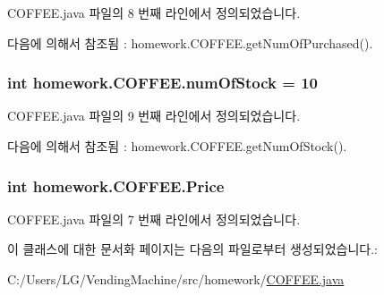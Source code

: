 C\+O\+F\+F\+E\+E.\+java 파일의 8 번째 라인에서 정의되었습니다.



다음에 의해서 참조됨 \+:  homework.\+C\+O\+F\+F\+E\+E.\+get\+Num\+Of\+Purchased().

\subsubsection[{\texorpdfstring{num\+Of\+Stock}{numOfStock}}]{\setlength{\rightskip}{0pt plus 5cm}int homework.\+C\+O\+F\+F\+E\+E.\+num\+Of\+Stock = 10\hspace{0.3cm}{\ttfamily [protected]}}\hypertarget{classhomework_1_1_c_o_f_f_e_e_a67a941996cd461c1e4aefd5aeb110ba9}{}\label{classhomework_1_1_c_o_f_f_e_e_a67a941996cd461c1e4aefd5aeb110ba9}


C\+O\+F\+F\+E\+E.\+java 파일의 9 번째 라인에서 정의되었습니다.



다음에 의해서 참조됨 \+:  homework.\+C\+O\+F\+F\+E\+E.\+get\+Num\+Of\+Stock().

\subsubsection[{\texorpdfstring{Price}{Price}}]{\setlength{\rightskip}{0pt plus 5cm}int homework.\+C\+O\+F\+F\+E\+E.\+Price\hspace{0.3cm}{\ttfamily [protected]}}\hypertarget{classhomework_1_1_c_o_f_f_e_e_a8b1ac1950929ce32fcd8bcc601560546}{}\label{classhomework_1_1_c_o_f_f_e_e_a8b1ac1950929ce32fcd8bcc601560546}


C\+O\+F\+F\+E\+E.\+java 파일의 7 번째 라인에서 정의되었습니다.



이 클래스에 대한 문서화 페이지는 다음의 파일로부터 생성되었습니다.\+:\begin{DoxyCompactItemize}
\item 
C\+:/\+Users/\+L\+G/\+Vending\+Machine/src/homework/\hyperlink{_c_o_f_f_e_e_8java}{C\+O\+F\+F\+E\+E.\+java}\end{DoxyCompactItemize}
